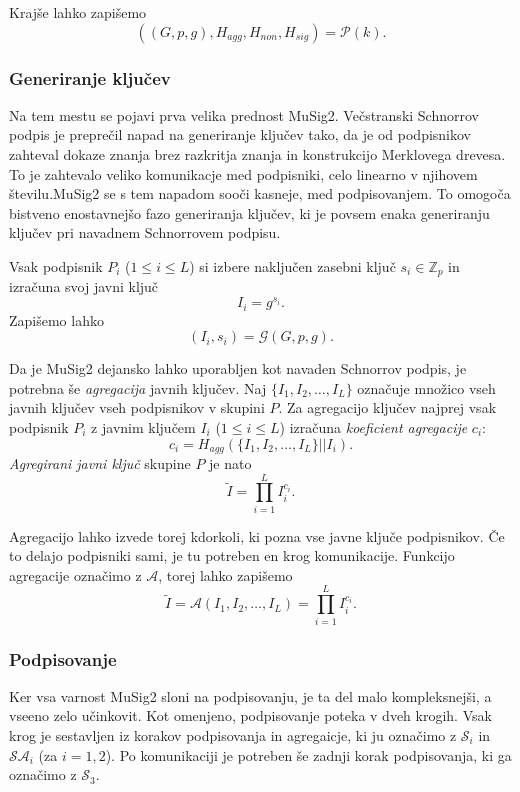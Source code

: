 \documentclass[isrm2, tisk]{fmfdelo}
\newcommand{\Z}{\mathbb Z}
\begin{document}
Krajše lahko zapišemo
$$
((G, p, g), H_{agg}, H_{non}, H_{sig}) = \mathcal{P}(k).
$$

\subsubsection{Generiranje ključev}
Na tem mestu se pojavi prva velika prednost MuSig2. Večstranski Schnorrov podpis je preprečil napad
na generiranje ključev tako, da je od podpisnikov zahteval dokaze znanja brez razkritja znanja in
konstrukcijo Merklovega drevesa. To je zahtevalo veliko komunikacje med podpisniki, celo linearno
v njihovem številu.MuSig2 se s tem napadom sooči kasneje, med podpisovanjem. To omogoča bistveno
enostavnejšo fazo generiranja ključev, ki je povsem enaka generiranju ključev pri navadnem
Schnorrovem podpisu.

Vsak podpisnik $P_i$ ($1 \le i \le L$) si izbere naključen zasebni ključ $s_i \in \Z_p$ in izračuna
svoj javni ključ
$$
I_i = g^{s_i}.
$$
Zapišemo lahko
$$
(I_i, s_i) = \mathcal{G}(G, p, g).
$$

Da je MuSig2 dejansko lahko uporabljen kot navaden Schnorrov podpis, je potrebna še \textit{agregacija}
javnih ključev. Naj $\{I_1, I_2, \dots, I_L\}$ označuje množico vseh javnih ključev vseh podpisnikov v
skupini $P$. Za agregacijo ključev najprej vsak podpisnik $P_i$ z javnim ključem $I_i$ ($1 \le i \le L$)
izračuna \textit{koeficient agregacije} $c_i$:
$$
c_i = H_{agg}(\{I_1, I_2, \dots, I_L\} || I_i).
$$
\textit{Agregirani javni ključ} skupine $P$ je nato
$$
\tilde{I} = \prod_{i=1}^L I_i^{c_i}.
$$

Agregacijo lahko izvede torej kdorkoli, ki pozna vse javne ključe podpisnikov. Če to delajo podpisniki
sami, je tu potreben en krog komunikacije. Funkcijo agregacije označimo z $\mathcal{A}$, torej
lahko zapišemo
$$
\tilde{I} = \mathcal{A}(I_1, I_2, \dots, I_L) = \prod_{i=1}^L I_i^{c_i}.
$$

\subsubsection{Podpisovanje}
Ker vsa varnost MuSig2 sloni na podpisovanju, je ta del malo kompleksnejši, a vseeno zelo učinkovit.
Kot omenjeno, podpisovanje poteka v dveh krogih. Vsak krog je sestavljen iz korakov podpisovanja
in agregaicje, ki ju označimo z $\mathcal{S}_i$ in $\mathcal{S}\mathcal{A}_i$ (za $i = 1, 2$). Po
komunikaciji je potreben še zadnji korak podpisovanja, ki ga označimo z $\mathcal{S}_3$.
\end{document}
